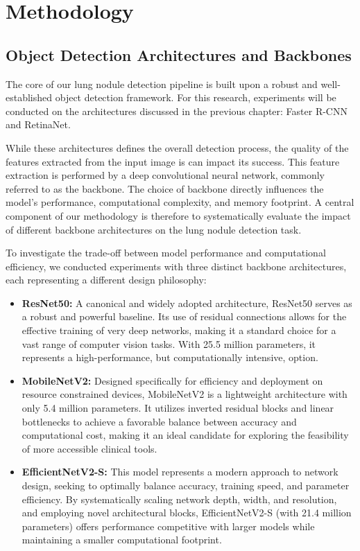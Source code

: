 \chapter{Methodology}
\section{Object Detection Architectures and Backbones}
\label{sec:arch_and_backbones}
The core of our lung nodule detection pipeline is built upon a robust and well-established object detection framework. For this research, experiments will be conducted on the architectures discussed in the previous chapter: Faster R-CNN and RetinaNet.

While these architectures defines the overall detection process, the quality of the features extracted from the input image is can impact its success. This feature extraction is performed by a deep convolutional neural network, commonly referred to as the backbone. The choice of backbone directly influences the model's performance, computational complexity, and memory footprint. A central component of our methodology is therefore to systematically evaluate the impact of different backbone architectures on the lung nodule detection task.

To investigate the trade-off between model performance and computational efficiency, we conducted experiments with three distinct backbone architectures, each representing a different design philosophy:

\begin{itemize}
    \item \textbf{ResNet50:} A canonical and widely adopted architecture, ResNet50 serves as a robust and powerful baseline. Its use of residual connections allows for the effective training of very deep networks, making it a standard choice for a vast range of computer vision tasks. With 25.5 million parameters, it represents a high-performance, but computationally intensive, option.

    \item \textbf{MobileNetV2:} Designed specifically for efficiency and deployment on resource constrained devices, MobileNetV2 is a lightweight architecture with only 5.4 million parameters. It utilizes inverted residual blocks and linear bottlenecks to achieve a favorable balance between accuracy and computational cost, making it an ideal candidate for exploring the feasibility of more accessible clinical tools.

    \item \textbf{EfficientNetV2-S:} This model represents a modern approach to network design, seeking to optimally balance accuracy, training speed, and parameter efficiency. By systematically scaling network depth, width, and resolution, and employing novel architectural blocks, EfficientNetV2-S (with 21.4 million parameters) offers performance competitive with larger models while maintaining a smaller computational footprint.
\end{itemize}

